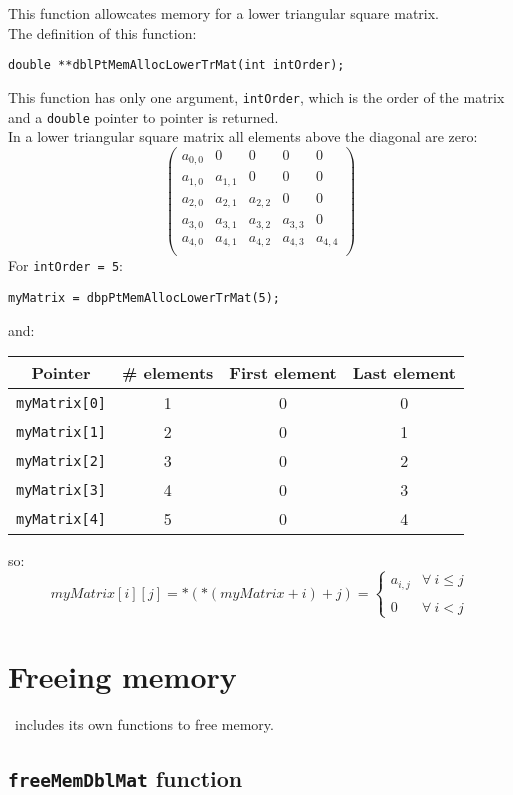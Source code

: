 This function allowcates memory for a lower triangular square matrix.\\

The definition of this function:
%
\begin{verbatim}
double **dblPtMemAllocLowerTrMat(int intOrder);
\end{verbatim}

This function has only one argument, \texttt{intOrder}, which is the order of the matrix and a \texttt{double} pointer to pointer is returned.\\

In a lower triangular square matrix all elements above the diagonal are zero: 
%
\begin{displaymath}
\left( \begin{array}{ccccc}
  a_{0,0} & 0      & 0      & 0      & 0 \\
  a_{1,0} & a_{1,1} & 0      & 0      & 0 \\ 
  a_{2,0} & a_{2,1} & a_{2,2} & 0      & 0 \\
  a_{3,0} & a_{3,1} & a_{3,2} & a_{3,3} & 0 \\
  a_{4,0} & a_{4,1} & a_{4,2} & a_{4,3} & a_{4,4} \\
\end{array} \right)
\end{displaymath}
%
For \texttt{intOrder = 5}:
%
\begin{verbatim}
myMatrix = dbpPtMemAllocLowerTrMat(5);  
\end{verbatim}
%
and:
\begin{center}
  \begin{tabular}{|c|c|c|c|}
    \hline
    \textbf{Pointer} & \textbf{\# elements} & \textbf{First element} & \textbf{Last element}\\
    \hline
    \texttt{myMatrix[0]} & 1 & 0 & 0\\
    \hline
    \texttt{myMatrix[1]} & 2 & 0 & 1\\
    \hline
    \texttt{myMatrix[2]} & 3 & 0 & 2\\
    \hline
    \texttt{myMatrix[3]} & 4 & 0 & 3\\
    \hline
    \texttt{myMatrix[4]} & 5 & 0 & 4\\
    \hline
  \end{tabular}
\end{center}
%
so:
%
\begin{displaymath}
  myMatrix[i][j] = *(*(myMatrix + i) + j) = \left\{ \begin{array}{ll}
    a_{i,j} & \forall \ i \le j \\
     & \\
    0 & \forall \ i < j
    \end{array} \right.    
\end{displaymath}

\section{Freeing memory} \label{sec:freeingMemory}

\BI\ includes its own functions to free memory.

\subsection{\texttt{freeMemDblMat} function} \label{sec:freeMemDblMat}


